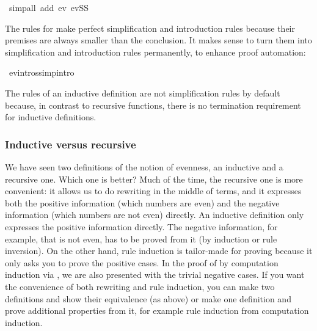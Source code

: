 \begin{isabellebody}
\ {}simp{}all\ add{}\ ev{}\ evSS{}%
\endisatagproof
{\isafoldproof}%
%
\isadelimproof
%
\endisadelimproof
%
\begin{isamarkuptext}%
The rules for  make perfect simplification and introduction
rules because their premises are always smaller than the conclusion. It
makes sense to turn them into simplification and introduction rules
permanently, to enhance proof automation:%
\end{isamarkuptext}%
\isamarkuptrue%
\isamarkupfalse%
\ ev{}intros{}simp{}intro{}%
\begin{isamarkuptext}%
The rules of an inductive definition are not simplification rules by
default because, in contrast to recursive functions, there is no termination
requirement for inductive definitions.

\subsubsection{Inductive versus recursive}

We have seen two definitions of the notion of evenness, an inductive and a
recursive one. Which one is better? Much of the time, the recursive one is
more convenient: it allows us to do rewriting in the middle of terms, and it
expresses both the positive information (which numbers are even) and the
negative information (which numbers are not even) directly. An inductive
definition only expresses the positive information directly. The negative
information, for example, that  is not even, has to be proved from
it (by induction or rule inversion). On the other hand, rule induction is
tailor-made for proving \mbox{} because it only asks you
to prove the positive cases. In the proof of  by
computation induction via , we are also presented
with the trivial negative cases. If you want the convenience of both
rewriting and rule induction, you can make two definitions and show their
equivalence (as above) or make one definition and prove additional properties
from it, for example rule induction from computation induction.


\end{isamarkuptext}
\end{isabellebody}
